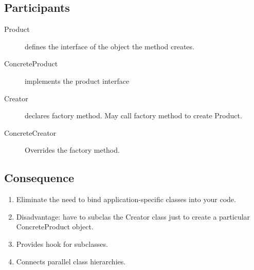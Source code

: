 \documentclass[11pt, a4paper]{book}
\begin{document}
\subsection{Participants}
\begin{description}
\item [Product] defines the interface of the object the method creates.
\item [ConcreteProduct] implements the product interface
\item [Creator] declares factory method. May call factory method to create
Product.
\item [ConcreteCreator] Overrides the factory method.
\end{description}
\subsection{Consequence}
\begin{enumerate}
    \item Eliminate the need to bind application-specific classes into your code.
    \item Disadvantage: have to subclas the Creator class just to create a
    particular ConcreteProduct object.
    \item Provides hook for subclasses.
    \item Connects parallel class hierarchies.
\end{enumerate}
\end{document}
